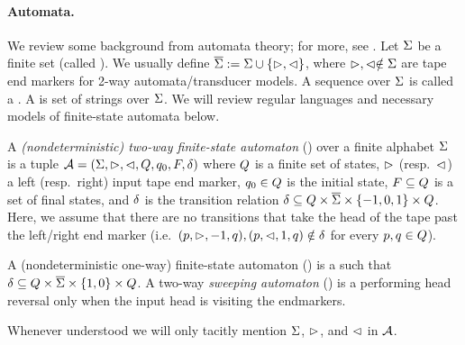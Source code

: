 \paragraph{Automata.} We review some background from automata theory;
for more, see \cite{Kozen-automata,HU79}. Let $\Sigma$ be a finite set (called
). We usually define  $\overline{\Sigma} := \Sigma \cup \{\vartriangleright,\vartriangleleft\}$, where $\vartriangleright,\vartriangleleft\notin \Sigma$ are tape end markers for 2-way automata/transducer models. 
 A sequence over $\Sigma$ is called a . A  is set of strings over $\Sigma$.
We will review regular languages and necessary models of finite-state automata below.

\begin{definition} \label{def:2nfa}
    A \emph{(nondeterministic) two-way finite-state automaton}
(\FFA{}) over a finite alphabet $\Sigma$ is a tuple $\mathcal{A} =
(\Sigma, \vartriangleright, \vartriangleleft, Q, q_0, F, \delta)$ where 
    $Q$ is a finite set of 
    states, $\vartriangleright$ (resp.~$\vartriangleleft$) a left (resp.~right) input tape end 
    marker, $q_0\in Q$ is
the initial state, $F\subseteq Q$ is a set of final states, and 
    $\delta$ is the
transition relation  $\delta\subseteq Q \times 
    \overline{\Sigma}\times \{-1, 0, 1\}\times Q$. 
    Here, we assume %
    that
    there are no transitions that take the head of the tape past the left/right
    end marker (i.e.~$(p,\vartriangleright,-1,q), (p,\vartriangleleft,1,q) \notin
    \delta$ for every $p, q \in Q$).

A (nondeterministic one-way) finite-state automaton (\FA{})
is a \FFA{} such that $\delta \subseteq Q \times \overline{\Sigma} \times
    \{1,0\} \times Q $.
%    
A two-way \emph{sweeping automaton} (\SFFA{})  is a \FFA{} performing head reversal only when the input head is visiting the endmarkers. 
\end{definition}
Whenever understood we will only tacitly mention $\Sigma$, 
$\vartriangleright$, and $\vartriangleleft$ in $\mathcal{A}$. 

